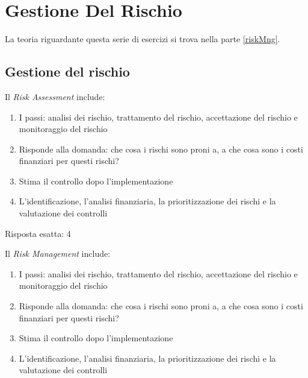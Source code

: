\chapter{Gestione Del Rischio}

La teoria riguardante questa serie di esercizi si trova nella
parte \ref{riskMng}.

\section{Gestione del rischio}

\label{esGestRisk}

\begin{Exercise} [
  title={Quiz},
  label={gestRisk1}
  ]

  \Question Il \textit{Risk Assessment} include:

\begin{enumerate}
 \item I passi: analisi dei rischio, trattamento del rischio, accettazione del
rischio e monitoraggio del rischio
 \item Risponde alla domanda: che cosa i rischi sono proni a, a che cosa sono i
costi finanziari per questi rischi?
 \item Stima il controllo dopo l'implementazione
 \item L'identificazione, l'analisi finanziaria, la prioritizzazione dei rischi
e la valutazione dei controlli
\end{enumerate}

\end{Exercise}


\begin{Answer} [
  ref={gestRisk1},
  number={1}
  ]

  \Question Risposta esatta: 4

\end{Answer}


\begin{Exercise} [
  title={Quiz},
  label={gestRisk2}
  ]

  \Question Il \textit{Risk Management} include:
\begin{enumerate}
 \item I passi: analisi dei rischio, trattamento del rischio, accettazione del
rischio e monitoraggio del rischio
 \item Risponde alla domanda: che cosa i rischi sono proni a, a che cosa sono i
costi finanziari per questi rischi?
 \item Stima il controllo dopo l'implementazione
 \item L'identificazione, l'analisi finanziaria, la prioritizzazione dei rischi
e la valutazione dei controlli
\end{enumerate}
\end{Exercise}



